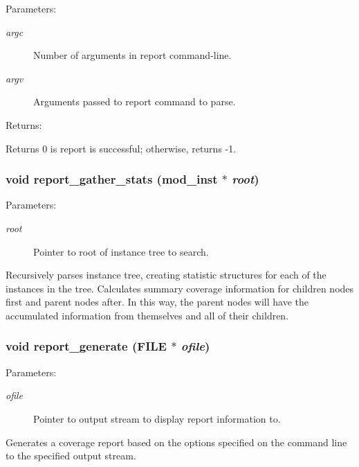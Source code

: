 \begin{Desc}
\item[Parameters: ]\par
\begin{description}
\item[{\em 
argc}]Number of arguments in report command-line. \item[{\em 
argv}]Arguments passed to report command to parse. \end{description}
\end{Desc}
\begin{Desc}
\item[Returns: ]\par
Returns 0 is report is successful; otherwise, returns -1. \end{Desc}
\subsubsection{\setlength{\rightskip}{0pt plus 5cm}void report\_\-gather\_\-stats ({\bf mod\_\-inst} $\ast$ {\em root})}\label{report_8c_a12}


\begin{Desc}
\item[Parameters: ]\par
\begin{description}
\item[{\em 
root}]Pointer to root of instance tree to search.\end{description}
\end{Desc}
Recursively parses instance tree, creating statistic structures for each of the instances in the tree. Calculates summary coverage information for children nodes first and parent nodes after. In this way, the parent nodes will have the accumulated information from themselves and all of their children. 
\subsubsection{\setlength{\rightskip}{0pt plus 5cm}void report\_\-generate (FILE $\ast$ {\em ofile})}\label{report_8c_a14}


\begin{Desc}
\item[Parameters: ]\par
\begin{description}
\item[{\em 
ofile}]Pointer to output stream to display report information to.\end{description}
\end{Desc}
Generates a coverage report based on the options specified on the command line to the specified output stream. 
